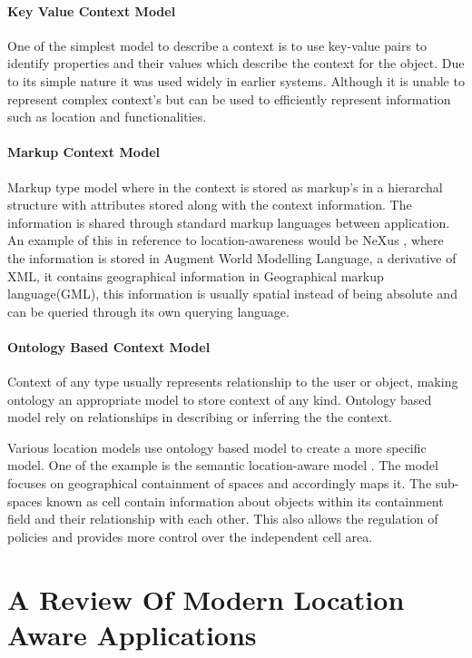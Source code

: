 \documentclass[12pt]{report}
\begin{document}
\subsubsection{Key Value Context Model}
One of the simplest model to describe a context is to use key-value pairs to identify properties and their values which describe the context for the object. Due to its simple nature it was used widely in earlier systems. Although it is unable to represent complex context's but can be used to efficiently represent information such as location and functionalities.



\subsubsection{Markup Context Model}
Markup type model where in the context is stored as markup's in a hierarchal structure with attributes stored along with the context information. The information is shared through standard markup languages between application. An example of this in reference to location-awareness would be NeXus \cite{hohl1999next}, where the information is stored in Augment World Modelling Language, a derivative of XML, it contains geographical information in Geographical markup language(GML), this information is usually spatial instead of being absolute and can be queried through its own querying language. 


\subsubsection{Ontology Based Context Model}
Context of any type usually represents relationship to the user or object, making ontology an appropriate model to store context of any kind. Ontology based model rely on relationships in describing or inferring the the context.


Various location models use ontology based model to create a more specific model. One of the example is the semantic location-aware model \cite{li2008semantic}. The model focuses on geographical containment of spaces and accordingly maps it. The sub-spaces known as cell contain information about objects within its containment field and their relationship with each other. This also allows the regulation of policies and provides more control over the independent cell area.


\chapter{A Review Of Modern Location Aware Applications}
\end{document}
